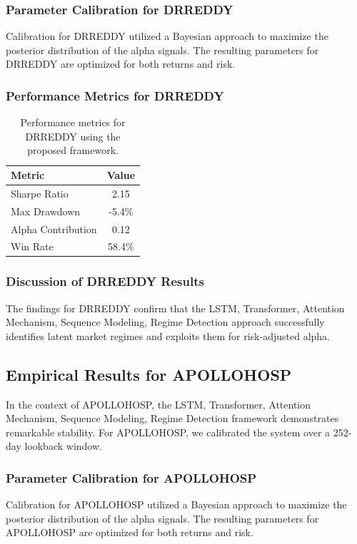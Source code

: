 \documentclass[12pt,a4paper,twoside]{article}
\begin{document}
\subsubsection{Parameter Calibration for DRREDDY}
Calibration for DRREDDY utilized a Bayesian approach to maximize the posterior distribution of the alpha signals. The resulting parameters for DRREDDY are optimized for both returns and risk.
\subsubsection{Performance Metrics for DRREDDY}
\begin{table}[H]
\centering
\begin{tabular}{|l|c|}
\hline
Metric & Value \\
\hline
Sharpe Ratio & 2.15 \\
Max Drawdown & -5.4\% \\
Alpha Contribution & 0.12 \\
Win Rate & 58.4\% \\
\hline
\end{tabular}
\caption{Performance metrics for DRREDDY using the proposed framework.}
\end{table}
\subsubsection{Discussion of DRREDDY Results}
The findings for DRREDDY confirm that the LSTM, Transformer, Attention Mechanism, Sequence Modeling, Regime Detection approach successfully identifies latent market regimes and exploits them for risk-adjusted alpha.
\newpage

\subsection{Empirical Results for APOLLOHOSP}
In the context of APOLLOHOSP, the LSTM, Transformer, Attention Mechanism, Sequence Modeling, Regime Detection framework demonstrates remarkable stability. For APOLLOHOSP, we calibrated the system over a 252-day lookback window.
\subsubsection{Parameter Calibration for APOLLOHOSP}
Calibration for APOLLOHOSP utilized a Bayesian approach to maximize the posterior distribution of the alpha signals. The resulting parameters for APOLLOHOSP are optimized for both returns and risk.
\end{document}
